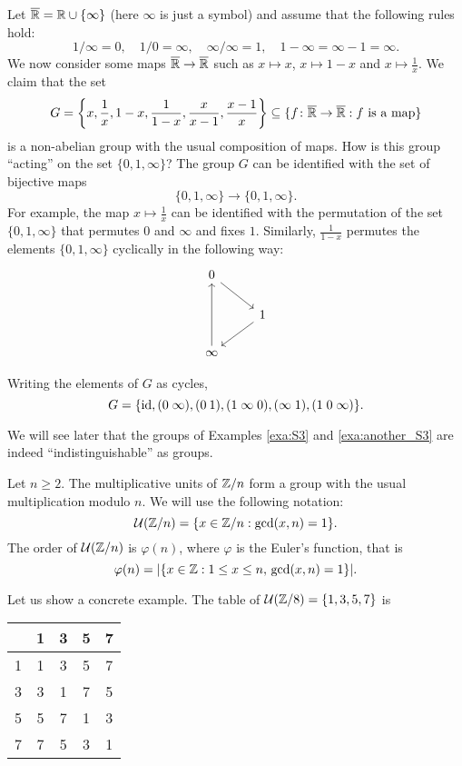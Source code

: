 \begin{example}
\label{exa:another_S3}
Let $\overline{\mathbb{R}}=\mathbb{R}\cup\{\infty\}$ (here $\infty$ is just a symbol) 
and assume that the following rules hold: 
\[
1/\infty=0,
\quad 1/0=\infty,
\quad \infty/\infty=1,
\quad 1-\infty=\infty-1=\infty.
\]
We now consider some maps $\overline{\mathbb{R}}\to\overline{\mathbb{R}}$ such as  
$x\mapsto x$, $x\mapsto 1-x$ and $x\mapsto\frac{1}{x}$. 
We claim that 
the set 
\[
G=\left\{x,\frac{1}{x},1-x,\frac{1}{1-x},\frac{x}{x-1},\frac{x-1}{x}\right\}
\subseteq\{f\colon\overline{\mathbb{R}}\to\overline{\mathbb{R}}:f\text{ is a map}\}
\]
is a non-abelian group with the usual composition of maps. How is this group ``acting'' on 
the set $\{0,1,\infty\}$? 
The group 
$G$ can be identified with the set of bijective maps 
\[
\{0,1,\infty\}\to\{0,1,\infty\}.
\]
For example, 
the map $x\mapsto\frac{1}{x}$ can be identified with the permutation of
the set 
$\{0,1,\infty\}$ that permutes $0$ and $\infty$ and fixes $1$. Similarly, 
$\frac{1}{1-x}$ permutes the elements $\{0,1,\infty\}$ cyclically 
in the following way:
\[
\begin{tikzcd}
        0 \\
        & 1 \\
        \infty
        \arrow[from=1-1, to=2-2]
        \arrow[from=2-2, to=3-1]
        \arrow[from=3-1, to=1-1]
\end{tikzcd}\]
\end{example}
Writing the elements of $G$ as cycles, 
\[
G=\{\operatorname{id},
(0\;\infty),
(0\:1),
(1\;\infty\;0),
(\infty\;1),
(1\;0\;\infty)\}.
\]

We will see later that the 
groups of Examples \ref{exa:S3} and \ref{exa:another_S3} are
indeed ``indistinguishable'' as groups. 

\begin{example}
Let $n\geq2$. The multiplicative units of $\mathbb{Z}/n$ form a group 
with the usual multiplication modulo $n$. 
We will use the following notation:
\[
\mathcal{U}(\mathbb{Z}/n)=\{x\in\mathbb{Z}/n:\gcd(x,n)=1\}.
\]
The order of $\mathcal{U}(\mathbb{Z}/n)$ is $\varphi(n)$, where $\varphi$ 
is the Euler's function, that is 
\[
\varphi(n)=|\{x\in\mathbb{Z}:1\leq x\leq n,\,\gcd(x,n)=1\}|.
\]

Let us show a concrete example. The table of 
$\mathcal{U}(\mathbb{Z}/8)=\{1,3,5,7\}$
is
\begin{center}
  \begin{tabular}{l|cccc}
     &1&3&5&7 \\
    \hline
    1 & 1 & 3 & 5 & 7\\
    3 & 3 & 1 & 7 & 5\\
    5 & 5 & 7 & 1 & 3\\
    7 & 7 & 5 & 3 & 1
  \end{tabular}
\end{center}
\end{example}

